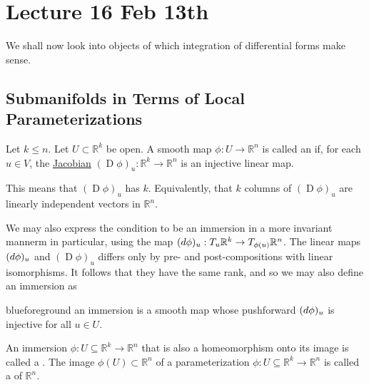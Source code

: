 \documentclass[notoc,notitlepage]{tufte-book}
\DeclareMathOperator{\D}{D}
\begin{document}
\chapter{Lecture 16 Feb 13th}%
\label{chp:lecture_16_feb_13th}

We shall now look into objects of which integration of differential
forms make sense.

\section{Submanifolds in Terms of Local Parameterizations}%
\label{sec:submanifolds_in_terms_of_local_parameterizations}

\begin{defn}[Immersion]\label{defn:immersion}
  Let $k \leq n$. Let $U \subset \mathbb{R}^k$ be open. A smooth map $\phi : U
  \to \mathbb{R}^n$ is called an  if, for each $u \in V$, the
  \hyperref[defn:differential]{Jacobian} $(\D \phi)_u : \mathbb{R}^k \to
  \mathbb{R}^n$ is an injective linear map.
\end{defn}

\begin{note}
  This means that $(\D \phi)_u$ has  $k$. Equivalently,
  that $k$ columns of $(\D \phi)_u$ are linearly independent vectors in
  $\mathbb{R}^n$.

  We may also express the condition to be an immersion in a more invariant
  mannerm in particular, using the   map $(\mathop{}\!d{\phi})_u : T_u
  \mathbb{R}^k \to T_{\phi(u)} \mathbb{R}^n$. The linear maps $(\mathop{}\!d{\phi})_u$
  and $(\D \phi)_u$ differs only by pre- and post-compositions with linear
  isomorphisms. It follows that they have the same rank, and so we may also
  define an immersion as
  \begin{quotebox}{blue}{foreground}
    an immersion is a smooth map whose pushforward $(\mathop{}\!d{\phi})_u$ is injective
    for all $u \in U$.
  \end{quotebox}
\end{note}

\begin{defn}\label{defn:parameterizations_and_parameterized_submanifolds}
  An immersion $\phi : U \subseteq \mathbb{R}^k \to \mathbb{R}^n$ that is also a
  homeomorphism onto its image is called a . The image
  $\phi(U) \subset \mathbb{R}^n$ of a parameterization $\phi : U \subseteq
  \mathbb{R}^k \to \mathbb{R}^n$ is called a  of $\mathbb{R}^n$.
\end{defn}
\end{document}
